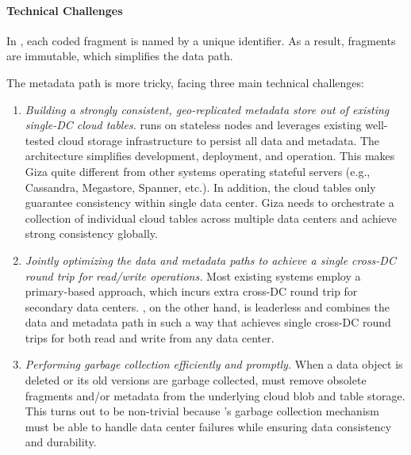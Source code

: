 \paragraph{Technical Challenges}
In \name, each coded fragment is named by a unique identifier.
As a result, fragments are immutable, which simplifies the data path.

The metadata path is more tricky, facing three main technical challenges:
\begin{enumerate}

\item {\it Building a strongly consistent, 
geo-replicated metadata store out of existing single-DC cloud tables.}
\name runs on stateless nodes and leverages existing well-tested
cloud storage infrastructure to persist all data and metadata.
The architecture simplifies development, deployment, and operation.
This makes Giza quite different from other systems
operating stateful servers (e.g., Cassandra, Megastore, Spanner, etc.).
In addition, the cloud tables only guarantee consistency within single data center.
Giza needs to orchestrate a collection of individual cloud tables across multiple data centers
and achieve strong consistency globally.

\item {\it Jointly optimizing the data and metadata paths to achieve a single
  cross-DC round trip for read/write operations.}
Most existing systems employ a primary-based approach,
which incurs extra cross-DC round trip for secondary data centers.
\name, on the other hand, is leaderless and
combines the data and metadata path in such a way that achieves
	single cross-DC round trips for both read and write from any data center.

\item {\it Performing garbage collection efficiently and promptly.} When a data
  object is deleted or its old versions are garbage collected, \name must
  remove obsolete fragments and/or metadata from the underlying cloud blob
	and table storage.
	This turns out to be non-trivial because \name's
  garbage collection mechanism must be able to handle data center failures while
  ensuring data consistency and durability.

\end{enumerate}

